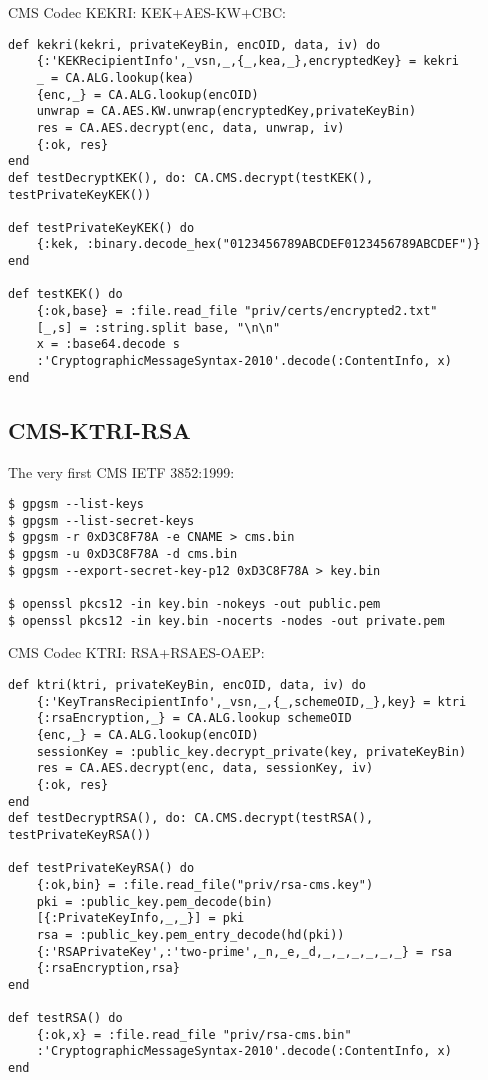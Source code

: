 CMS Codec KEKRI: KEK+AES-KW+CBC:

\begin{lstlisting}
def kekri(kekri, privateKeyBin, encOID, data, iv) do
    {:'KEKRecipientInfo',_vsn,_,{_,kea,_},encryptedKey} = kekri
    _ = CA.ALG.lookup(kea)
    {enc,_} = CA.ALG.lookup(encOID)
    unwrap = CA.AES.KW.unwrap(encryptedKey,privateKeyBin)
    res = CA.AES.decrypt(enc, data, unwrap, iv)
    {:ok, res}
end
def testDecryptKEK(), do: CA.CMS.decrypt(testKEK(), testPrivateKeyKEK())

def testPrivateKeyKEK() do
    {:kek, :binary.decode_hex("0123456789ABCDEF0123456789ABCDEF")}
end

def testKEK() do
    {:ok,base} = :file.read_file "priv/certs/encrypted2.txt"
    [_,s] = :string.split base, "\n\n"
    x = :base64.decode s
    :'CryptographicMessageSyntax-2010'.decode(:ContentInfo, x)
end
\end{lstlisting}

\newpage
\subsection{CMS-KTRI-RSA}

The very first CMS IETF 3852:1999:

\begin{lstlisting}
$ gpgsm --list-keys
$ gpgsm --list-secret-keys
$ gpgsm -r 0xD3C8F78A -e CNAME > cms.bin
$ gpgsm -u 0xD3C8F78A -d cms.bin
$ gpgsm --export-secret-key-p12 0xD3C8F78A > key.bin

$ openssl pkcs12 -in key.bin -nokeys -out public.pem
$ openssl pkcs12 -in key.bin -nocerts -nodes -out private.pem
\end{lstlisting}

CMS Codec KTRI: RSA+RSAES-OAEP:

\begin{lstlisting}
def ktri(ktri, privateKeyBin, encOID, data, iv) do
    {:'KeyTransRecipientInfo',_vsn,_,{_,schemeOID,_},key} = ktri
    {:rsaEncryption,_} = CA.ALG.lookup schemeOID
    {enc,_} = CA.ALG.lookup(encOID)
    sessionKey = :public_key.decrypt_private(key, privateKeyBin)
    res = CA.AES.decrypt(enc, data, sessionKey, iv)
    {:ok, res}
end
def testDecryptRSA(), do: CA.CMS.decrypt(testRSA(), testPrivateKeyRSA())

def testPrivateKeyRSA() do
    {:ok,bin} = :file.read_file("priv/rsa-cms.key")
    pki = :public_key.pem_decode(bin)
    [{:PrivateKeyInfo,_,_}] = pki
    rsa = :public_key.pem_entry_decode(hd(pki))
    {:'RSAPrivateKey',:'two-prime',_n,_e,_d,_,_,_,_,_,_} = rsa
    {:rsaEncryption,rsa}
end

def testRSA() do
    {:ok,x} = :file.read_file "priv/rsa-cms.bin"
    :'CryptographicMessageSyntax-2010'.decode(:ContentInfo, x)
end
\end{lstlisting}

